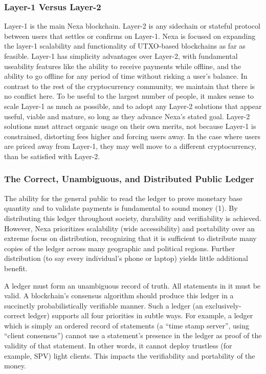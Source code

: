 \documentclass[a4paper, 11pt]{article}
\begin{document}
\subsubsection{Layer-1 Versus Layer-2}
Layer-1 is the main Nexa blockchain. Layer-2 is any sidechain or stateful protocol between users that settles or confirms on Layer-1. 
Nexa is focused on expanding the layer-1 scalability and functionality of UTXO-based blockchains as far as feasible.  Layer-1 has simplicity advantages over Layer-2, with fundamental useability features like the ability to receive payments while offline, and the ability to go offline for any period of time without risking a user’s balance.
In contrast to the rest of the cryptocurrency community, we maintain that there is no conflict here.  To be useful to the largest number of people, it makes sense to scale Layer-1 as much as possible, and to adopt any Layer-2 solutions that appear useful, viable and mature, so long as they advance Nexa’s stated goal. Layer-2 solutions must attract organic usage on their own merits, not because Layer-1 is constrained, distorting fees higher and forcing users away. In the case where users are priced away from Layer-1, they may well move to a different cryptocurrency, than be satisfied with Layer-2.

\subsubsection{The Correct, Unambiguous, and Distributed Public Ledger}
The ability for the general public to read the ledger to prove monetary base quantity and to validate payments is fundamental to sound money (1).  By distributing this ledger throughout society, durability and verifiability is achieved.  However, Nexa prioritizes scalability (wide accessibility) and portability over an extreme focus on distribution, recognizing that it is sufficient to distribute many copies of the ledger across many geographic and political regions.  Further distribution (to say every individual’s phone or laptop) yields little additional benefit.

A ledger must form an unambiguous record of truth.  All statements in it must be valid.  A blockchain’s consensus algorithm should produce this ledger in a succinctly probabilistically verifiable manner.  Such a ledger (an exclusively-correct ledger) supports all four priorities in subtle ways.  For example, a ledger which is simply an ordered record of statements (a “time stamp server”, using “client consensus”) cannot use a statement’s presence in the ledger as proof of the validity of that statement.  In other words, it cannot deploy trustless (for example, SPV) light clients.  This impacts the verifiability and portability of the money.  
\end{document}
